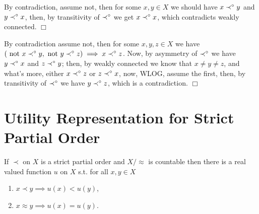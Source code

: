 \documentclass{article}
\theoremstyle{definition}
\def\tnot{\text{ not }}
\begin{document}
 By contradiction, assume not, then for some $x,y\in X$ we should have $x\prec^\circ y$ and $y\prec^\circ x$, then, by transitivity of $\prec^\circ$ we get $x\prec^\circ x$, which contradicts weakly connected. $\Box$

 By contradiction assume not, then for some $x,y,z\in X$ we have $(\tnot x\precs y,\tnot y\precs z)\implies x\precs z$. Now, by asymmetry of $\prec^\circ$ we have $y\prec^\circ x$ and $z\prec^\circ y$; then, by weakly connected we know that $x\not=y\not=z$, and what's more, either $x\prec^\circ z$ or $z\prec^\circ x$, now, WLOG, assume the first, then, by transitivity of $\prec^\circ$ we have $y\prec^\circ z$, which is a contradiction. $\Box$

\section{Utility Representation for Strict Partial Order}

 If $\prec$ on $X$ is a strict partial order and $X/\approx$ is countable then there is a real valued function $u$ on $X$ s.t. for all $x,y\in X$

\begin{enumerate}
\item $x\prec y\implies u(x)<u(y)$,
\item $x\approx y\implies u(x)=u(y)$.
\end{enumerate}
\end{document}
